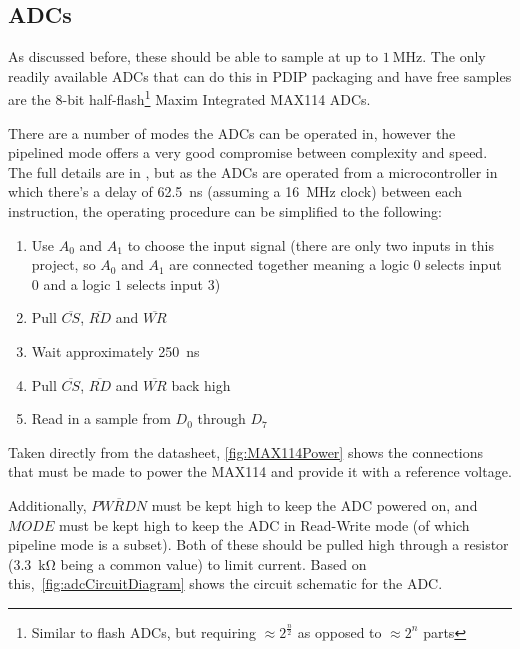 \subsection{ADCs}
\label{sec:adcs}

As discussed before, these should be able to sample at up to $\SI{1}{\MHz}$. The
only readily available ADCs that can do this in PDIP packaging and have free
samples are the 8-bit half-flash\footnote{Similar to flash ADCs, but requiring
$\approx2^{\frac{n}{2}}$ as opposed to $\approx 2^n$ parts} Maxim Integrated
MAX114 ADCs.

There are a number of modes the ADCs can be operated in, however the pipelined
mode offers a very good compromise between complexity and speed. The full
details are in \textcite{MAX114}, but as the ADCs are operated from a
microcontroller in which there's a delay of \SI{62.5}{\ns} (assuming a
\SI{16}{\MHz} clock) between each instruction, the operating procedure can be
simplified to the following:

\begin{enumerate}
  \item Use $A_0$ and $A_1$ to choose the input signal (there are only two
    inputs in this project, so $A_0$ and $A_1$ are connected together meaning a
    logic $0$ selects input 0 and a logic $1$ selects input 3)
  \item Pull $\overline{CS}$, $\overline{RD}$ and $\overline{WR}$
  \item Wait approximately \SI{250}{\ns}
  \item Pull $\overline{CS}$, $\overline{RD}$ and $\overline{WR}$ back high
  \item Read in a sample from $D_0$ through $D_7$
\end{enumerate}

Taken directly from the datasheet, \cref{fig:MAX114Power} shows the connections
that must be made to power the MAX114 and provide it with a reference voltage.

Additionally, $\overline{PWRDN}$ must be kept high to keep the ADC powered on,
and $MODE$ must be kept high to keep the ADC in Read-Write mode (of which
pipeline mode is a subset). Both of these should be pulled high through a
resistor (\SI{3.3}{\kilo\ohm} being a common value) to limit current. Based on
this,~\cref{fig:adcCircuitDiagram} shows the circuit schematic for the ADC.

